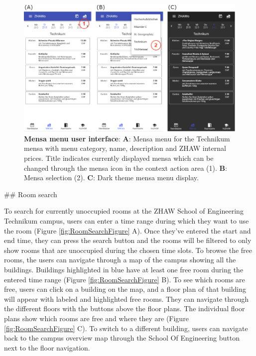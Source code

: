 \begin{markdown}
\begin{figure}[H]
  \includegraphics[width=16cm, center]{./figures/menu_figure.png}
  \captionsetup{width=15.5cm}
  \caption[Mensa menu user interface]{\textbf{Mensa menu user interface}: \textbf{A}: Mensa menu for the Technikum mensa with menu category, name, description and ZHAW internal prices. Title indicates currently displayed mensa which can be changed through the mensa icon in the context action area (1). \textbf{B}: Mensa selection (2). \textbf{C}: Dark theme mensa menu display.}
  \label{fig:MenuFigure}
\end{figure}

\newpage

## Room search

To search for currently unoccupied rooms at the ZHAW School of Engineering Technikum campus, users can enter a time range during which they want to use the room (Figure \ref{fig:RoomSearchFigure} A). Once they've entered the start and end time, they can press the search button and the rooms will be filtered to only show rooms that are unoccupied during the chosen time slots. To browse the free rooms, the users can navigate through a map of the  campus showing all the buildings. Buildings highlighted in blue have at least one free room during the entered time range (Figure \ref{fig:RoomSearchFigure} B). To see which rooms are free, users can click on a building on the map, and a floor plan of that building will appear with labeled and highlighted free rooms. They can navigate through the different floors with the buttons above the floor plans. The individual floor plans show which rooms are free and where they are (Figure \ref{fig:RoomSearchFigure} C). To switch to a different building, users can navigate back to the campus overview map through the School Of Engineering button next to the floor navigation.


\end{markdown}
